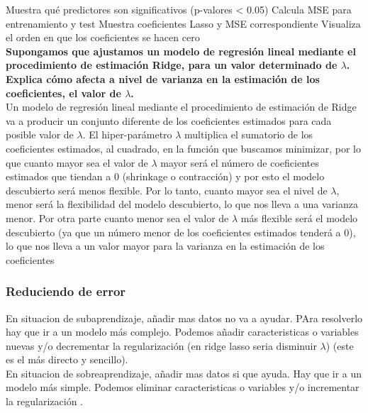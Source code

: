 Muestra qué predictores son significativos (p-valores < 0.05)
Calcula MSE para entrenamiento y test
Muestra coeficientes Lasso y MSE correspondiente
Visualiza el orden en que los coeficientes se hacen cero \\

\textbf{Supongamos que ajustamos un modelo de regresión lineal mediante el procedimiento de estimación Ridge, para un valor determinado de $\lambda$.
Explica cómo afecta a nivel de varianza en la estimación de los coeficientes, el valor de $\lambda$.} \\

Un modelo de regresión lineal mediante el procedimiento de estimación de Ridge va a producir un conjunto diferente de los coeficientes
estimados para cada posible valor de $\lambda$. El hiper-parámetro $\lambda$ multiplica el sumatorio de los coeficientes estimados, al cuadrado, en la
función que buscamos minimizar, por lo que cuanto mayor sea el valor de $\lambda$ mayor será el número de coeficientes estimados que tiendan a
0 (shrinkage o contracción) y por esto el modelo descubierto será menos flexible.
Por lo tanto, cuanto mayor sea el nivel de $\lambda$, menor será la flexibilidad del modelo descubierto, lo que nos lleva a una varianza menor.
Por otra parte cuanto menor sea el valor de $\lambda$ más flexible será el modelo descubierto (ya que un número menor de los coeficientes
estimados tenderá a 0), lo que nos lleva a un valor mayor para la varianza en la estimación de los coeficientes

\subsubsection{Reduciendo de error}

En situacion de subaprendizaje, añadir mas datos no va a ayudar. PAra resolverlo hay que ir a un modelo más complejo. Podemos añadir caracteristicas o variables nuevas y/o decrementar la regularización (en ridge lasso seria disminuir $\lambda$) (este es el más directo y sencillo). \\

En situacion de sobreaprendizaje, añadir mas datos si que ayuda. Hay que ir a un modelo más simple. Podemos eliminar caracteristicas o variables y/o incrementar la regularización .